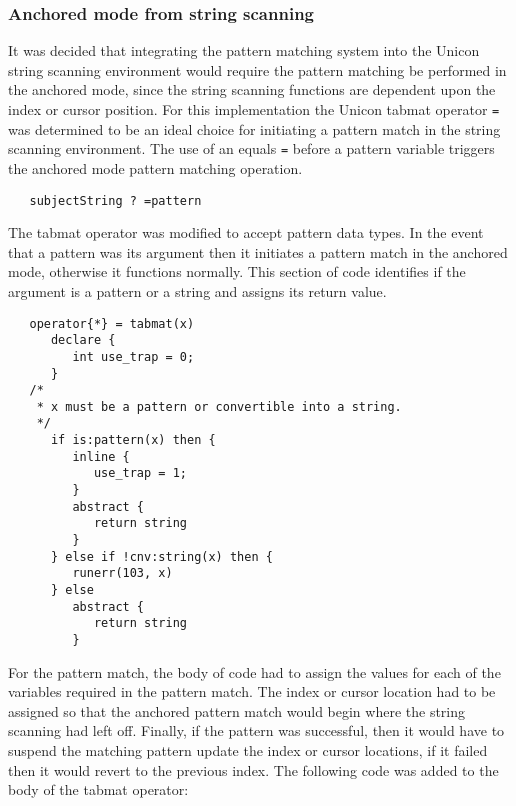 \documentclass{article}
\begin{document}
\subsubsection{Anchored mode from string scanning}
It was decided that integrating the pattern matching system into the Unicon string scanning environment would require the pattern matching be performed in the anchored mode, since the string scanning functions are dependent upon the index or cursor position.  For this implementation the Unicon tabmat operator \texttt{=} was determined to be an ideal choice for initiating a pattern match in the string scanning environment.  The use of an equals \texttt{=} before a pattern variable triggers the anchored mode pattern matching operation.
 
\begin{verbatim}
   subjectString ? =pattern
\end{verbatim}

The tabmat operator was modified to accept pattern data types.  In the event that a pattern was its argument then it initiates a pattern match in the anchored mode, otherwise it functions normally.  This section of code identifies if the argument is a pattern or a string and assigns its return value.

\begin{verbatim}
   operator{*} = tabmat(x)
      declare {
         int use_trap = 0;
      }
   /*
    * x must be a pattern or convertible into a string.
    */
      if is:pattern(x) then {
         inline {
            use_trap = 1;
         }
         abstract {
            return string
         }
      } else if !cnv:string(x) then {
         runerr(103, x)
      } else 
         abstract {
            return string
         }
\end{verbatim}

For the pattern match, the body of code had to assign the values for each of the variables required in the pattern match.  The index or cursor location had to be assigned so that the anchored pattern match would begin where the string scanning had left off.  Finally, if the pattern was successful, then it would have to suspend the matching pattern update the index or cursor locations, if it failed then it would revert to the previous index.  The following code was added to the body of the tabmat operator:
\end{document}
